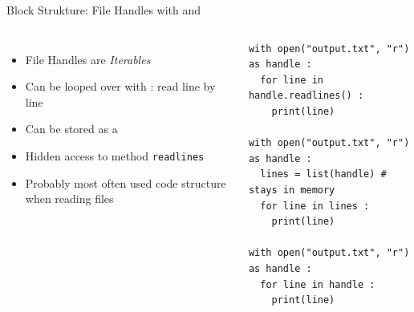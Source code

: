\begin{frame}[fragile]{Block Strukture: File Handles with  and }
%
\begin{columns}[T]
\begin{itemize}
\item File Handles are \emph{Iterables}
\item Can be looped over with : read line by line
\item Can be stored as a  
\item Hidden access to method \texttt{readlines}
\item Probably most often used code structure when reading files
\end{itemize}
%
\begin{codebox}
\begin{verbatim}
with open("output.txt", "r") as handle :
  for line in handle.readlines() :
    print(line)

with open("output.txt", "r") as handle :
  lines = list(handle) # stays in memory
  for line in lines :
    print(line)

with open("output.txt", "r") as handle :
  for line in handle :
    print(line)
\end{verbatim}
\end{codebox}
%
\end{columns}
%
\end{frame}


